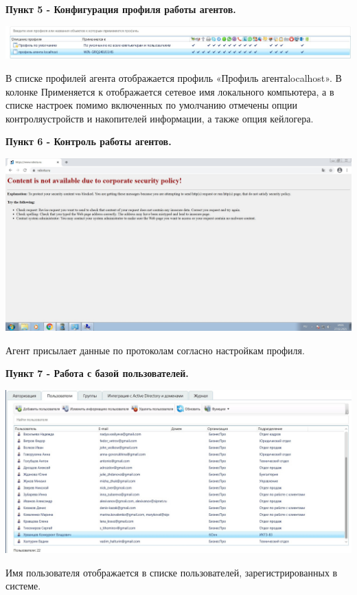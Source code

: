 \documentclass[a4paper,14pt]{extarticle}
\begin{document}
    \textbf{Пункт 5 - Конфигурация профиля работы агентов.} 
    \begin{center}
        \includegraphics[scale=0.3]{pics/5.jpg}

        В списке профилей агента отображается профиль «Профиль агентаlocalhost». 
        В колонке Применяется к отображается сетевое имя локального компьютера, 
        а в списке настроек помимо включенных по умолчанию отмечены опции контроляустройств 
        и накопителей информации, а также опция кейлогера.
    \end{center}

    \textbf{Пункт 6 - Контроль работы агентов.} 
    \begin{center}
        \includegraphics[scale=0.25]{pics/6.jpg}
        
        Агент присылает данные по протоколам согласно настройкам профиля.
    \end{center}

    \textbf{Пункт 7 - Работа с базой пользователей.} 
    \begin{center}
        \includegraphics[scale=0.25]{pics/7.jpg}

        Имя пользователя отображается в списке пользователей, зарегистрированных в системе.
    \end{center}
\end{document}
